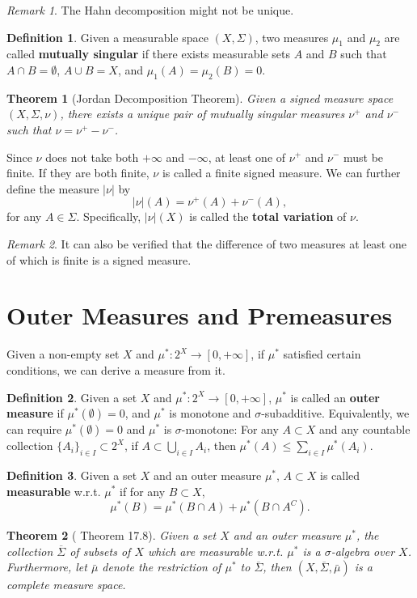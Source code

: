 \documentclass[openany]{book}
\newtheorem{theorem}{Theorem}[chapter]
\theoremstyle{definition}
\newtheorem{definition}{Definition}[chapter]
\theoremstyle{remark}
\newtheorem*{remark}{Remark}
\begin{document}
\begin{remark}
    The Hahn decomposition might not be unique.
\end{remark}
\begin{definition}
    Given a measurable space $(X,\Sigma)$, two measures $\mu_1$ and $\mu_2$ are called \textbf{mutually singular} if there exists measurable sets $A$ and $B$ such that $A\cap B=\emptyset$, $A\cup B=X$, and $\mu_1(A)=\mu_2(B)=0$.
\end{definition}
\begin{theorem}[Jordan Decomposition Theorem]
    Given a signed measure space $(X,\Sigma,\nu)$, there exists a unique pair of mutually singular measures $\nu^+$ and $\nu^-$ such that $\nu=\nu^+-\nu^-$.
\end{theorem}
Since $\nu$ does not take both $+\infty$ and $-\infty$, at least one of $\nu^+$ and $\nu^-$ must be finite. If they are both finite, $\nu$ is called a finite signed measure. We can further define the measure $|\nu|$ by
\begin{equation*}
    |\nu|(A)=\nu^+(A)+\nu^-(A),
\end{equation*}
for any $A\in\Sigma$. Specifically, $|\nu|(X)$ is called the \textbf{total variation} of $\nu$.
\begin{remark}
    It can also be verified that the difference of two measures at least one of which is finite is a signed measure.
\end{remark}

\section{Outer Measures and Premeasures} %
Given a non-empty set $X$ and $\mu^*:2^X\to[0,+\infty]$, if $\mu^*$ satisfied certain conditions, we can derive a measure from it.
\begin{definition}
    Given a set $X$ and $\mu^*:2^X\to[0,+\infty]$, $\mu^*$ is called an \textbf{outer measure} if $\mu^*(\emptyset)=0$, and $\mu^*$ is monotone and $\sigma$-subadditive. Equivalently, we can require $\mu^*(\emptyset)=0$ and $\mu^*$ is $\sigma$-monotone: For any $A\subset X$ and any countable collection $\{A_i\}_{i\in I}\subset 2^X$, if $A\subset\bigcup_{i\in I}A_i$, then $\mu^*(A)\le \sum_{i\in I}^{}\mu^*(A_i)$.
\end{definition}
\begin{definition}
    Given a set $X$ and an outer measure $\mu^*$, $A\subset X$ is called \textbf{measurable} w.r.t. $\mu^*$ if for any $B\subset X$,
    \begin{equation*}
        \mu^*(B)=\mu^*(B\cap A)+\mu^*(B\cap A^C).
    \end{equation*}
\end{definition}
\begin{theorem}[\cite{RF88} Theorem 17.8]
    Given a set $X$ and an outer measure $\mu^*$, the collection $\overline{\Sigma}$ of subsets of $X$ which are measurable w.r.t. $\mu^*$ is a $\sigma$-algebra over $X$. Furthermore, let $\bar{\mu}$ denote the restriction of $\mu^*$ to $\overline{\Sigma}$, then $(X,\overline{\Sigma},\bar{\mu})$ is a complete measure space.
\end{theorem}
\end{document}
